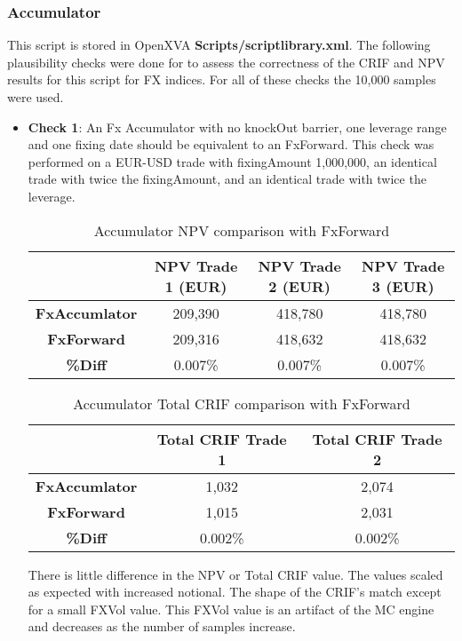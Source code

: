 \subsubsection{Accumulator}
This script is stored in OpenXVA \textbf{Scripts/scriptlibrary.xml}. 
The following plausibility checks were done for to assess the correctness of the CRIF and NPV results for this script for FX indices.
For all of these checks the 10,000 samples were used.

\begin{itemize}
\item \textbf{Check 1}: An Fx Accumulator with no knockOut barrier, one leverage range and one fixing date should be equivalent to an FxForward.
This check was performed on a EUR-USD trade with fixingAmount 1,000,000, an identical trade with twice the fixingAmount, and an identical trade with twice the leverage.

\begin{table}[H]
\centering
  \begin{tabular}{|c|c|c|c|}
    \hline
  & \bfseries{NPV Trade 1 (EUR)} & \bfseries{NPV Trade 2 (EUR)} & \bfseries{NPV Trade 3 (EUR)} \\
    \hline
  \bfseries{FxAccumlator} & 209,390 & 418,780 & 418,780\\
  \bfseries{FxForward} & 209,316 & 418,632 & 418,632\\
  \bfseries{\%Diff} & 0.007\% & 0.007\%  & 0.007\% \\ 
  \hline
  \end{tabular}
  \caption{Accumulator NPV comparison with FxForward}
\end{table}

\begin{table}[H]
\centering
  \begin{tabular}{|c|c|c|}
    \hline
  & \bfseries{Total CRIF Trade 1} & \bfseries{Total CRIF Trade 2} \\
    \hline
  \bfseries{FxAccumlator} & 1,032 & 2,074 \\
  \bfseries{FxForward} & 1,015 & 2,031 \\
  \bfseries{\%Diff} & 0.002\% & 0.002\%  \\ 
  \hline
  \end{tabular}
  \caption{Accumulator Total CRIF comparison with FxForward}
\end{table}

There is little difference in the NPV or Total CRIF value. The values scaled as expected with increased notional.
The shape of the CRIF's match except for a small FXVol value. This FXVol value is an artifact of the MC engine and decreases as the number of samples increase.


\end{itemize}
